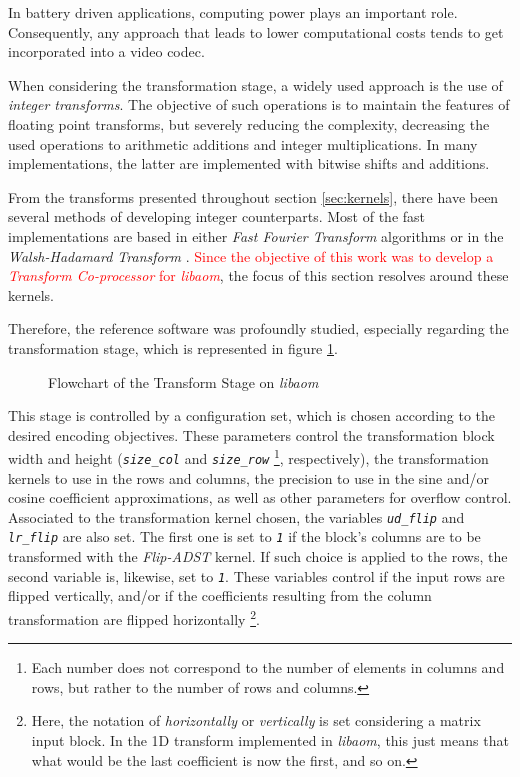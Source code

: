 In battery driven applications, computing power plays an important role. Consequently, any approach that leads to lower computational costs tends to get incorporated into a video codec.

When considering the transformation stage, a widely used approach is the use of \emph{integer transforms}. The objective of such operations is to maintain the features of floating point transforms, but severely reducing the complexity, decreasing the used operations to arithmetic additions and integer multiplications. In many implementations, the latter are implemented with bitwise shifts and additions.

From the transforms presented throughout section \ref{sec:kernels}, there have been several methods of developing integer counterparts. Most of the fast implementations are based in either \emph{Fast Fourier Transform} algorithms or in the \emph{Walsh-Hadamard Transform} \cite{wolterParallelArchitecturesDiscrete1992,yonghongzengIntegerDCTsFast2001}. \textcolor{red}{Since the objective of this work was to develop a \emph{Transform Co-processor} for \emph{libaom}}, the focus of this section resolves around these kernels. 

Therefore, the reference software was profoundly studied, especially regarding the transformation stage, which is represented in figure \ref{fig:libtrans}.

\begin{figure}[!htbp]
    \centering
    
    \caption{Flowchart of the Transform Stage on \emph{libaom}}
    \label{fig:libtrans}
\end{figure}

This stage is controlled by a configuration set, which is chosen according to the desired encoding objectives. These parameters control the transformation block width and height (\emph{\texttt{size\_col}} and \emph{\texttt{size\_row}} \footnote{Each number does not correspond to the number of elements in columns and rows, but rather to the number of rows and columns.}, respectively), the transformation kernels to use in the rows and columns, the precision to use in the sine and/or cosine coefficient approximations, as well as other parameters for overflow control. Associated to the transformation kernel chosen, the variables \emph{\texttt{ud\_flip}} and \emph{\texttt{lr\_flip}} are also set. The first one is set to \emph{\texttt{1}} if the block's columns are to be transformed with the \emph{Flip-ADST} kernel. If such choice is applied to the rows, the second variable is, likewise, set to \emph{\texttt{1}}. These variables control if the input rows are flipped vertically, and/or if the coefficients resulting from the column transformation are flipped horizontally \footnote{Here, the notation of \emph{horizontally} or \emph{vertically} is set considering a matrix input block. In the 1D transform implemented in \emph{libaom}, this just means that what would be the last coefficient is now the first, and so on.}.

